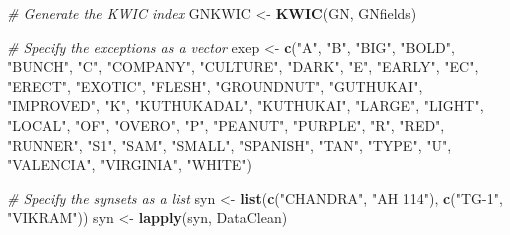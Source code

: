 \documentclass[
]{article}
\newenvironment{Shaded}{\begin{snugshade}}{\end{snugshade}}
\newcommand{\CommentTok}[1]{\textcolor[rgb]{0.56,0.35,0.01}{\textit{#1}}}
\newcommand{\KeywordTok}[1]{\textcolor[rgb]{0.13,0.29,0.53}{\textbf{#1}}}
\newcommand{\NormalTok}[1]{#1}
\newcommand{\StringTok}[1]{\textcolor[rgb]{0.31,0.60,0.02}{#1}}
\begin{document}
\begin{Shaded}
\begin{Highlighting}[]
\CommentTok{# Generate the KWIC index}
\NormalTok{GNKWIC <-}\StringTok{ }\KeywordTok{KWIC}\NormalTok{(GN, GNfields)}

\CommentTok{# Specify the exceptions as a vector}
\NormalTok{exep <-}\StringTok{ }\KeywordTok{c}\NormalTok{(}\StringTok{"A"}\NormalTok{, }\StringTok{"B"}\NormalTok{, }\StringTok{"BIG"}\NormalTok{, }\StringTok{"BOLD"}\NormalTok{, }\StringTok{"BUNCH"}\NormalTok{, }\StringTok{"C"}\NormalTok{, }\StringTok{"COMPANY"}\NormalTok{, }\StringTok{"CULTURE"}\NormalTok{, }\StringTok{"DARK"}\NormalTok{,}
          \StringTok{"E"}\NormalTok{, }\StringTok{"EARLY"}\NormalTok{, }\StringTok{"EC"}\NormalTok{, }\StringTok{"ERECT"}\NormalTok{, }\StringTok{"EXOTIC"}\NormalTok{, }\StringTok{"FLESH"}\NormalTok{, }\StringTok{"GROUNDNUT"}\NormalTok{, }\StringTok{"GUTHUKAI"}\NormalTok{,}
          \StringTok{"IMPROVED"}\NormalTok{, }\StringTok{"K"}\NormalTok{, }\StringTok{"KUTHUKADAL"}\NormalTok{, }\StringTok{"KUTHUKAI"}\NormalTok{, }\StringTok{"LARGE"}\NormalTok{, }\StringTok{"LIGHT"}\NormalTok{, }\StringTok{"LOCAL"}\NormalTok{,}
          \StringTok{"OF"}\NormalTok{, }\StringTok{"OVERO"}\NormalTok{, }\StringTok{"P"}\NormalTok{, }\StringTok{"PEANUT"}\NormalTok{, }\StringTok{"PURPLE"}\NormalTok{, }\StringTok{"R"}\NormalTok{, }\StringTok{"RED"}\NormalTok{, }\StringTok{"RUNNER"}\NormalTok{, }\StringTok{"S1"}\NormalTok{, }\StringTok{"SAM"}\NormalTok{,}
          \StringTok{"SMALL"}\NormalTok{, }\StringTok{"SPANISH"}\NormalTok{, }\StringTok{"TAN"}\NormalTok{, }\StringTok{"TYPE"}\NormalTok{, }\StringTok{"U"}\NormalTok{, }\StringTok{"VALENCIA"}\NormalTok{, }\StringTok{"VIRGINIA"}\NormalTok{, }\StringTok{"WHITE"}\NormalTok{)}

\CommentTok{# Specify the synsets as a list}
\NormalTok{syn <-}\StringTok{ }\KeywordTok{list}\NormalTok{(}\KeywordTok{c}\NormalTok{(}\StringTok{"CHANDRA"}\NormalTok{, }\StringTok{"AH 114"}\NormalTok{), }\KeywordTok{c}\NormalTok{(}\StringTok{"TG-1"}\NormalTok{, }\StringTok{"VIKRAM"}\NormalTok{))}
\NormalTok{syn <-}\StringTok{ }\KeywordTok{lapply}\NormalTok{(syn, DataClean)}
\end{Highlighting}
\end{Shaded}
\end{document}

